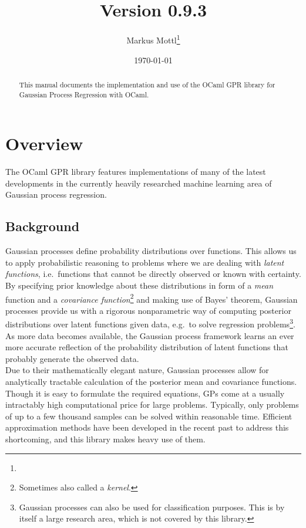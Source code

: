 \documentclass[10pt]{report}
\title{\footahref{https://bitbucket.org/mmottl/gpr}{Gaussian Process Regression
with OCaml}\\Version 0.9.3}
\author{Markus Mottl\footnote{\mail}}
\date{\today}
\begin{document}
\maketitle

\begin{abstract}

This manual documents the implementation and use of the OCaml GPR
library for Gaussian Process Regression with OCaml.

\end{abstract}

\tableofcontents

\chapter{Overview}

The OCaml GPR library features implementations of many of the latest
developments in the currently heavily researched machine learning area of
Gaussian process regression.

\section{Background}

Gaussian processes define probability distributions over functions.
This allows us to apply probabilistic reasoning to problems where we are
dealing with \emph{latent functions}, i.e.\ functions that cannot be directly
observed or known with certainty.  By specifying prior knowledge about
these distributions in form of a \emph{mean} function and a \emph{covariance
function}\footnote{Sometimes also called a \emph{kernel}.} and making use of
Bayes' theorem, Gaussian processes provide us with a rigorous nonparametric
way of computing posterior distributions over latent functions given data,
e.g.\ to solve regression problems\footnote{Gaussian processes can also be
used for classification purposes.  This is by itself a large research area,
which is not covered by this library.}.  As more data becomes available,
the Gaussian process framework learns an ever more accurate reflection of
the probability distribution of latent functions that probably generate the
observed data.\\

Due to their mathematically elegant nature, Gaussian processes allow for
analytically tractable calculation of the posterior mean and covariance
functions.  Though it is easy to formulate the required equations, GPs come at a
usually intractably high computational price for large problems.  Typically,
only problems of up to a few thousand samples can be solved within reasonable
time.  Efficient approximation methods have been developed in the recent past to
address this shortcoming, and this library makes heavy use of them.\\
\end{document}
